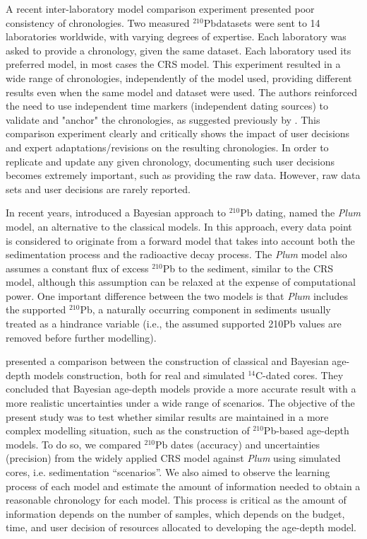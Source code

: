 \documentclass [10pt] {article}
\begin{document}
	A recent inter-laboratory model comparison experiment \citep{Barsanti2020}presented poor consistency of chronologies.
Two measured $^{210}$Pbdatasets were sent to 14 laboratories worldwide, with varying degrees of expertise. Each laboratory was asked to provide a chronology, given the same dataset. Each laboratory used its preferred model, in most cases the CRS model. This experiment resulted in a wide range of chronologies, independently of the model used, providing different results even when the same model and dataset were used. The authors reinforced the need to use independent time markers (independent dating sources) to validate and "anchor" the chronologies, as suggested previously by \citet{Smith2001}.  
This comparison experiment clearly and critically shows the impact of user decisions and expert adaptations/revisions on the resulting chronologies. In order to replicate and update any given chronology, documenting such user decisions becomes extremely important, such as providing the raw data. However, raw data sets and user decisions are rarely reported.

In recent years, \citet{Aquino2018} introduced a Bayesian approach to $^{210}$Pb dating, named the \textit{Plum} model, an alternative to the classical models. In this approach, every data point is considered to originate from a forward model that takes into account both the sedimentation process and the radioactive decay process. The \textit{Plum} model also assumes a constant flux of excess $^{210}$Pb to the sediment, similar to the CRS model, although this assumption can be relaxed at the expense of computational power. One important difference between the two models is that \textit{Plum} includes the supported $^{210}$Pb, a naturally occurring component in sediments usually treated as a hindrance variable (i.e., the assumed supported 210Pb values are removed before further modelling).

	\citet{Blaauw2018} presented a comparison between the construction of classical and Bayesian age-depth models construction, both for real and simulated $^{14}$C-dated cores.
They concluded that Bayesian age-depth models provide a more accurate result with a more realistic uncertainties under a wide range of scenarios.  
The objective of the present study was to test whether similar results are maintained in a more complex modelling situation, such as the construction of $^{210}$Pb-based age-depth models.
To do so, we compared $^{210}$Pb dates (accuracy) and uncertainties (precision) from the widely applied CRS model against \textit{Plum} using simulated cores, i.e. sedimentation ``scenarios''.
We also aimed to observe the learning process of each model and estimate the amount of information needed to obtain a reasonable chronology for each model.
This process is critical as the amount of information depends on the number of samples, which depends on the budget, time, and user decision of resources allocated to developing the age-depth model.
\end{document}
